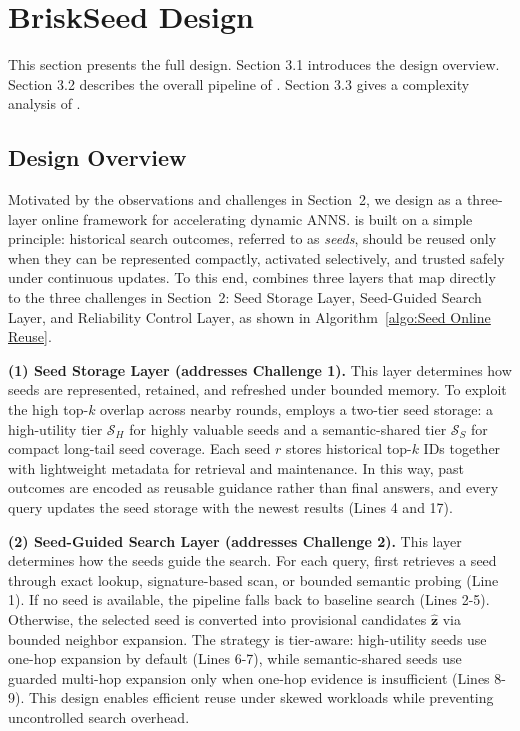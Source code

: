 \section{BriskSeed Design}
\label{sec:briskseed-design}

This section presents the full \system design.
Section 3.1 introduces the design overview.
Section 3.2 describes the overall pipeline of \system.
Section 3.3 gives a complexity analysis of \system.

\subsection{Design Overview}


Motivated by the observations and challenges in Section~2, we design \textbf{\system} as a three-layer online framework for accelerating dynamic ANNS. 
\system is built on a simple principle: historical search outcomes, referred to as \emph{seeds}, should be reused only when they can be represented compactly, activated selectively, and trusted safely under continuous updates. 
To this end, \system combines three layers that map directly to the three challenges in Section~2: Seed Storage Layer, Seed-Guided Search Layer, and Reliability Control Layer, as shown in Algorithm~\ref{algo:Seed Online Reuse}.

\noindent\textbf{(1) Seed Storage Layer (addresses Challenge 1).}
This layer determines how seeds are represented, retained, and refreshed under bounded memory. 
To exploit the high top-$k$ overlap across nearby rounds, \system employs a two-tier seed storage: a high-utility tier $\mathcal{S}_H$ for highly valuable seeds and a semantic-shared tier $\mathcal{S}_S$ for compact long-tail seed coverage. 
Each seed $r$ stores historical top-$k$ IDs together with lightweight metadata for retrieval and maintenance. 
In this way, past outcomes are encoded as reusable guidance rather than final answers, and every query updates the seed storage with the newest results (Lines 4 and 17).

\noindent\textbf{(2) Seed-Guided Search Layer (addresses Challenge 2).}
This layer determines how the seeds guide the search. 
For each query, \system first retrieves a seed through exact lookup, signature-based scan, or bounded semantic probing (Line 1). If no seed is available, the pipeline falls back to baseline search (Lines 2-5). Otherwise, the selected seed is converted into provisional candidates $\hat{\mathbf{z}}$ via bounded neighbor expansion. 
The strategy is tier-aware: high-utility seeds use one-hop expansion by default (Lines 6-7), while semantic-shared seeds use guarded multi-hop expansion only when one-hop evidence is insufficient (Lines 8-9).
This design enables efficient reuse under skewed workloads while preventing uncontrolled search overhead.

